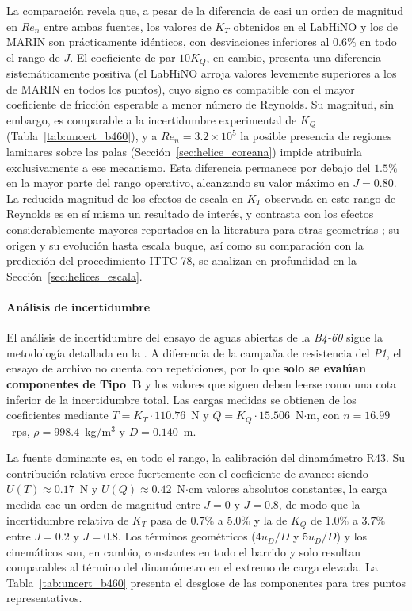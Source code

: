 La comparación revela que, a pesar de la diferencia de casi un orden de magnitud en $Re_n$ entre ambas fuentes, los valores de $K_T$ obtenidos en el LabHiNO y los de MARIN son prácticamente idénticos, con desviaciones inferiores al $0.6\%$ en todo el rango de $J$. El coeficiente de par $10K_Q$, en cambio, presenta una diferencia sistemáticamente positiva (el LabHiNO arroja valores levemente superiores a los de MARIN en todos los puntos), cuyo signo es compatible con el mayor coeficiente de fricción esperable a menor número de Reynolds. Su magnitud, sin embargo, es comparable a la incertidumbre experimental de $K_Q$ (Tabla~\ref{tab:uncert_b460}), y a $Re_n = 3.2\times10^5$ la posible presencia de regiones laminares sobre las palas (Sección~\ref{sec:helice_coreana}) impide atribuirla exclusivamente a ese mecanismo. Esta diferencia permanece por debajo del $1.5\%$ en la mayor parte del rango operativo, alcanzando su valor máximo en $J = 0.80$. La reducida magnitud de los efectos de escala en $K_T$ observada en este rango de Reynolds es en sí misma un resultado de interés, y contrasta con los efectos considerablemente mayores reportados en la literatura para otras geometrías \citep{krasilnikov2016cfd}; su origen y su evolución hasta escala buque, así como su comparación con la predicción del procedimiento ITTC-78, se analizan en profundidad en la Sección~\ref{sec:helices_escala}.

\paragraph{Análisis de incertidumbre}

El análisis de incertidumbre del ensayo de aguas abiertas de la \textit{B4-60} sigue la metodología detallada en la . A diferencia de la campaña de resistencia del \textit{P1}, el ensayo de archivo no cuenta con repeticiones, por lo que \textbf{solo se evalúan componentes de Tipo~B} y los valores que siguen deben leerse como una cota inferior de la incertidumbre total. Las cargas medidas se obtienen de los coeficientes mediante $T = K_T \cdot 110.76$~N y $Q = K_Q \cdot 15.506$~N$\cdot$m, con $n = 16.99$~rps, $\rho = 998.4$~kg/m$^3$ y $D = 0.140$~m.

La fuente dominante es, en todo el rango, la calibración del dinamómetro R43. Su contribución relativa crece fuertemente con el coeficiente de avance: siendo $U(T) \approx 0.17$~N y $U(Q) \approx 0.42$~N$\cdot$cm valores absolutos constantes, la carga medida cae un orden de magnitud entre $J = 0$ y $J = 0.8$, de modo que la incertidumbre relativa de $K_T$ pasa de $0.7\%$ a $5.0\%$ y la de $K_Q$ de $1.0\%$ a $3.7\%$ entre $J = 0.2$ y $J = 0.8$. Los términos geométricos ($4u_D/D$ y $5u_D/D$) y los cinemáticos son, en cambio, constantes en todo el barrido y solo resultan comparables al término del dinamómetro en el extremo de carga elevada. La Tabla~\ref{tab:uncert_b460} presenta el desglose de las componentes para tres puntos representativos.

